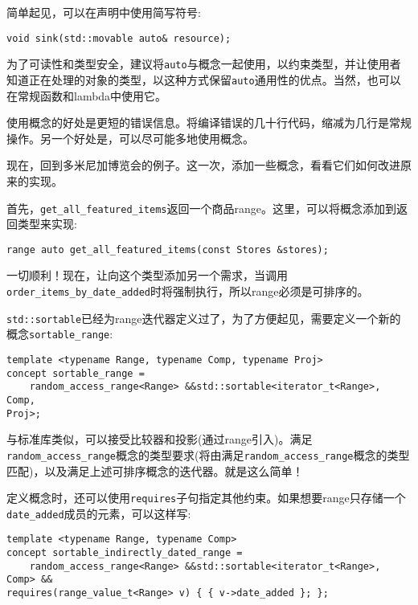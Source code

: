 简单起见，可以在声明中使用简写符号:

\begin{lstlisting}[style=styleCXX]
void sink(std::movable auto& resource);
\end{lstlisting}

为了可读性和类型安全，建议将\texttt{auto}与概念一起使用，以约束类型，并让使用者知道正在处理的对象的类型，以这种方式保留\texttt{auto}通用性的优点。当然，也可以在常规函数和lambda中使用它。

使用概念的好处是更短的错误信息。将编译错误的几十行代码，缩减为几行是常规操作。另一个好处是，可以尽可能多地使用概念。

现在，回到多米尼加博览会的例子。这一次，添加一些概念，看看它们如何改进原来的实现。

首先，\texttt{get\_all\_featured\_items}返回一个商品range。这里，可以将概念添加到返回类型来实现:

\begin{lstlisting}[style=styleCXX]
range auto get_all_featured_items(const Stores &stores);
\end{lstlisting}

一切顺利！现在，让向这个类型添加另一个需求，当调用\texttt{order\_items\_by\_date\_added}时将强制执行，所以range必须是可排序的。

\texttt{std::sortable}已经为range迭代器定义过了，为了方便起见，需要定义一个新的概念\texttt{sortable\_range}:

\begin{lstlisting}[style=styleCXX]
template <typename Range, typename Comp, typename Proj>
concept sortable_range =
	random_access_range<Range> &&std::sortable<iterator_t<Range>, Comp,
Proj>;
\end{lstlisting}

与标准库类似，可以接受比较器和投影(通过range引入)。满足\texttt{random\_access\_range}概念的类型要求(将由满足\texttt{random\_access\_range}概念的类型匹配)，以及满足上述可排序概念的迭代器。就是这么简单！

定义概念时，还可以使用\texttt{requires}子句指定其他约束。如果想要range只存储一个\texttt{date\_added}成员的元素，可以这样写:

\begin{lstlisting}[style=styleCXX]
template <typename Range, typename Comp>
concept sortable_indirectly_dated_range =
	random_access_range<Range> &&std::sortable<iterator_t<Range>, Comp> &&
requires(range_value_t<Range> v) { { v->date_added }; };
\end{lstlisting}

